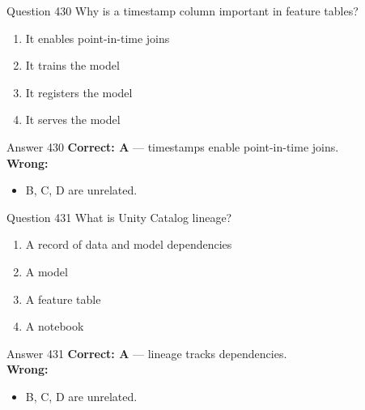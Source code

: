 \documentclass[aspectratio=169,11pt]{beamer}
\begin{document}
	\begin{frame}{Question 430}
		Why is a timestamp column important in feature tables?
		\begin{enumerate}[label=\Alph*.]
			\item It enables point-in-time joins
			\item It trains the model
			\item It registers the model
			\item It serves the model
		\end{enumerate}
	\end{frame}
	\begin{frame}{Answer 430}
		\textbf{Correct: A} --- timestamps enable point-in-time joins.\\
		\vspace{0.5em}
		\textbf{Wrong:}
		\begin{itemize}
			\item B, C, D are unrelated.
		\end{itemize}
	\end{frame}
	
	\begin{frame}{Question 431}
		What is Unity Catalog lineage?
		\begin{enumerate}[label=\Alph*.]
			\item A record of data and model dependencies
			\item A model
			\item A feature table
			\item A notebook
		\end{enumerate}
	\end{frame}
	\begin{frame}{Answer 431}
		\textbf{Correct: A} --- lineage tracks dependencies.\\
		\vspace{0.5em}
		\textbf{Wrong:}
		\begin{itemize}
			\item B, C, D are unrelated.
		\end{itemize}
	\end{frame}
	
\end{document}
